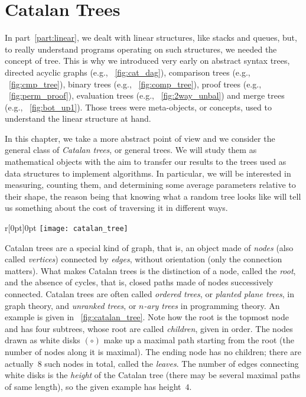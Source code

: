 \chapter{Catalan Trees}
\label{chap:Catalan}

In part~\ref{part:linear}, we dealt with linear structures, like
stacks and queues, but, to really understand programs operating on
such structures, we needed the concept of tree. This is why we
introduced very early on abstract syntax trees, directed acyclic graphs (e.g.,
\fig~\vref{fig:cat_dag}), comparison trees (e.g.,
\fig~\vref{fig:cmp_tree}), binary trees (e.g.,
\fig~\vref{fig:comp_tree}), proof trees (e.g.,
\fig~\vref{fig:perm_proof}), evaluation trees (e.g.,
\fig~\vref{fig:2way_unbal}) and merge trees (e.g.,
\fig~\vref{fig:bot_up1}). Those trees were meta\hyp{}objects, or
concepts, used to understand the linear structure at hand.

In this chapter, we take a more abstract point of view and we consider
the general class of \emph{Catalan trees}, or general trees. We will
study them as mathematical objects with the aim to transfer our
results to the trees used as data structures to implement
algorithms. In particular, we will be interested in measuring,
counting them, and determining some average parameters relative to
their shape, the reason being that knowing what a random tree looks
like will tell us something about the cost of traversing it in
different ways.

%
\begin{wrapfigure}[9]{r}[0pt]{0pt}
\centering
\texttt{[image: catalan\_tree]}
\caption{Catalan tree of height~4\label{fig:catalan_tree}}
\end{wrapfigure}
Catalan trees are a special kind of graph, that is, an object made of
\emph{nodes} (also called \emph{vertices}) connected by \emph{edges},
without orientation (only the connection matters). What makes Catalan
trees is the distinction of a node, called the \emph{root}, and the
absence of cycles, that is, closed paths made of nodes successively
connected. Catalan trees are often called \emph{ordered trees}, or
\emph{planted plane trees}, in graph theory, and \emph{unranked
  trees}, or \emph{\(n\)-ary trees} in programming theory. An example
is given in \fig~\ref{fig:catalan_tree}. Note how the root is the
topmost node and has four subtrees, whose root are called
\emph{children}, given in order. The nodes drawn as white disks
\((\circ)\) make up a maximal path starting from the root (the number
of nodes along it is maximal). The ending node has no children; there
are actually~\(8\) such nodes in total, called the \emph{leaves}. The
number of edges connecting white disks is the \emph{height} of the
Catalan tree (there may be several maximal paths of same length), so
the given example has height~\(4\).

